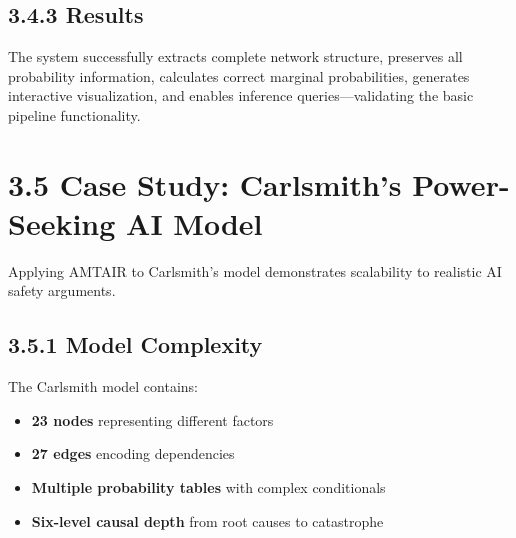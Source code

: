 \documentclass[
  11pt,
  letterpaper,
]{book}
\providecommand{\tightlist}{%
  \setlength{\itemsep}{0pt}\setlength{\parskip}{0pt}}
\begin{document}
\subsection*{3.4.3 Results}\label{sec-rsg-results}

\begin{tcolorbox}[enhanced jigsaw, opacityback=0, leftrule=.75mm, breakable, coltitle=black, colbacktitle=quarto-callout-tip-color!10!white, bottomrule=.15mm, rightrule=.15mm, toprule=.15mm, left=2mm, bottomtitle=1mm, arc=.35mm, toptitle=1mm, titlerule=0mm, title=\textcolor{quarto-callout-tip-color}{\faLightbulb}\hspace{0.5em}{Validation Success}, opacitybacktitle=0.6, colframe=quarto-callout-tip-color-frame, colback=white]

The system successfully extracts complete network structure, preserves
all probability information, calculates correct marginal probabilities,
generates interactive visualization, and enables inference
queries---validating the basic pipeline functionality.

\end{tcolorbox}

\section*{3.5 Case Study: Carlsmith's Power-Seeking AI
Model}\label{sec-case-carlsmith}


Applying AMTAIR to Carlsmith's model demonstrates scalability to
realistic AI safety arguments.

\subsection*{3.5.1 Model Complexity}\label{sec-carlsmith-complexity}

The Carlsmith model contains:

\begin{itemize}
\tightlist
\item
  \textbf{23 nodes} representing different factors
\item
  \textbf{27 edges} encoding dependencies
\item
  \textbf{Multiple probability tables} with complex conditionals
\item
  \textbf{Six-level causal depth} from root causes to catastrophe
\end{itemize}
\end{document}
